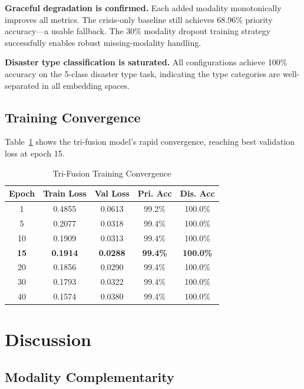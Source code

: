 \documentclass[journal]{IEEEtran}
\begin{document}
\textbf{Graceful degradation is confirmed.} Each added modality monotonically improves all metrics. The crisis-only baseline still achieves 68.96\% priority accuracy---a usable fallback. The 30\% modality dropout training strategy successfully enables robust missing-modality handling.

\textbf{Disaster type classification is saturated.} All configurations achieve 100\% accuracy on the 5-class disaster type task, indicating the type categories are well-separated in all embedding spaces.

\subsection{Training Convergence}

Table~\ref{tab:convergence} shows the tri-fusion model's rapid convergence, reaching best validation loss at epoch 15.

\begin{table}[!t]
\centering
\caption{Tri-Fusion Training Convergence}
\label{tab:convergence}
\begin{tabular}{ccccc}
\toprule
\textbf{Epoch} & \textbf{Train Loss} & \textbf{Val Loss} & \textbf{Pri. Acc} & \textbf{Dis. Acc} \\
\midrule
1  & 0.4855 & 0.0613 & 99.2\% & 100.0\% \\
5  & 0.2077 & 0.0318 & 99.4\% & 100.0\% \\
10 & 0.1909 & 0.0313 & 99.4\% & 100.0\% \\
\textbf{15} & \textbf{0.1914} & \textbf{0.0288} & \textbf{99.4\%} & \textbf{100.0\%} \\
20 & 0.1856 & 0.0290 & 99.4\% & 100.0\% \\
30 & 0.1793 & 0.0322 & 99.4\% & 100.0\% \\
40 & 0.1574 & 0.0380 & 99.4\% & 100.0\% \\
\bottomrule
\end{tabular}
\end{table}

\section{Discussion}

\subsection{Modality Complementarity}
\end{document}
